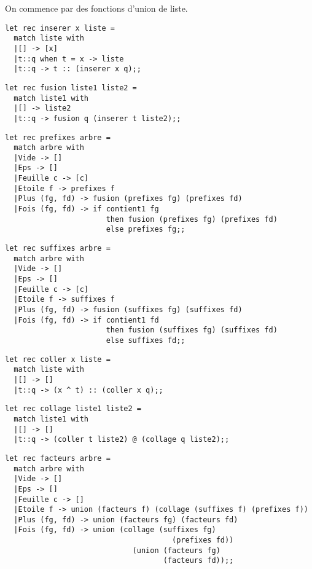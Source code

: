 \begin{Answer}
On commence par des fonctions d'union de liste.

\begin{lstlisting}
let rec inserer x liste =
  match liste with
  |[] -> [x]
  |t::q when t = x -> liste
  |t::q -> t :: (inserer x q);;  
\end{lstlisting}
\begin{lstlisting}
let rec fusion liste1 liste2 =
  match liste1 with
  |[] -> liste2
  |t::q -> fusion q (inserer t liste2);;
\end{lstlisting}
\newpage
\begin{lstlisting}
let rec prefixes arbre = 
  match arbre with
  |Vide -> []
  |Eps -> []
  |Feuille c -> [c]
  |Etoile f -> prefixes f
  |Plus (fg, fd) -> fusion (prefixes fg) (prefixes fd)
  |Fois (fg, fd) -> if contient1 fg
                       then fusion (prefixes fg) (prefixes fd)
                       else prefixes fg;; 
\end{lstlisting}
\begin{lstlisting}
let rec suffixes arbre = 
  match arbre with
  |Vide -> []
  |Eps -> []
  |Feuille c -> [c]
  |Etoile f -> suffixes f
  |Plus (fg, fd) -> fusion (suffixes fg) (suffixes fd)
  |Fois (fg, fd) -> if contient1 fd
                       then fusion (suffixes fg) (suffixes fd)
                       else suffixes fd;; 
\end{lstlisting}
\begin{lstlisting}
let rec coller x liste =
  match liste with
  |[] -> []
  |t::q -> (x ^ t) :: (coller x q);;
\end{lstlisting}
\begin{lstlisting}
let rec collage liste1 liste2 =
  match liste1 with
  |[] -> []
  |t::q -> (coller t liste2) @ (collage q liste2);;
\end{lstlisting}
\begin{lstlisting}
let rec facteurs arbre = 
  match arbre with
  |Vide -> []
  |Eps -> []
  |Feuille c -> []
  |Etoile f -> union (facteurs f) (collage (suffixes f) (prefixes f))
  |Plus (fg, fd) -> union (facteurs fg) (facteurs fd)
  |Fois (fg, fd) -> union (collage (suffixes fg) 
                                      (prefixes fd))
                             (union (facteurs fg) 
                                    (facteurs fd));;
\end{lstlisting}
\newpage
\end{Answer}

